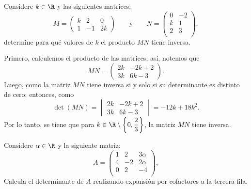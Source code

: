 \documentclass[11pt,respuestas,a4]{aleph-examen}
\begin{document}
\begin{preguntas}
\item
    Considere $k\in \R$ y las siguientes matrices:
    \[
    	M=\begin{pmatrix}
    	  	k & 2 & 0\\ 1 & -1 & 2k
    	  	\end{pmatrix}
    	\qquad\text{y}\qquad
    	N=\begin{pmatrix}
    	  	0 & -2\\
                k & 1\\
                2 & 3\\
    	  \end{pmatrix},
    \]
    determine para qué valores de $k$ el producto $MN$ tiene inversa.

\begin{respuesta}
    Primero, calculemos el producto de las matrices; así, notemos que 
    \[
        MN = \begin{pmatrix}
            2k & -2k+2 \\
            3k & 6k-3
        \end{pmatrix}.
    \]
    Luego, como la matriz $MN$ tiene inversa si y solo si su determinante es distinto de cero; entonces, como 
    \[
        \det(MN) = \begin{vmatrix}
            2k & -2k+2 \\
            3k & 6k-3
        \end{vmatrix} = -12k+18k^2.
    \]
    Por lo tanto, se tiene que para $k\in\R\setminus\left\{0,\dfrac{2}{3}\right\}$, la matriz $MN$ tiene inversa. 
\end{respuesta}

\item
    Considere $\alpha\in \R$ y la siguiente matriz:
    \[
    	A=\begin{pmatrix}
    	  1 & 2 & 3\alpha \\
            4 & -2 & 2\alpha \\
            0 & 2 & -4 \\
    	\end{pmatrix},
    \]
    Calcula el determinante de $A$ realizando expansión por cofactores a la tercera fila.


\end{preguntas}
\end{document}
